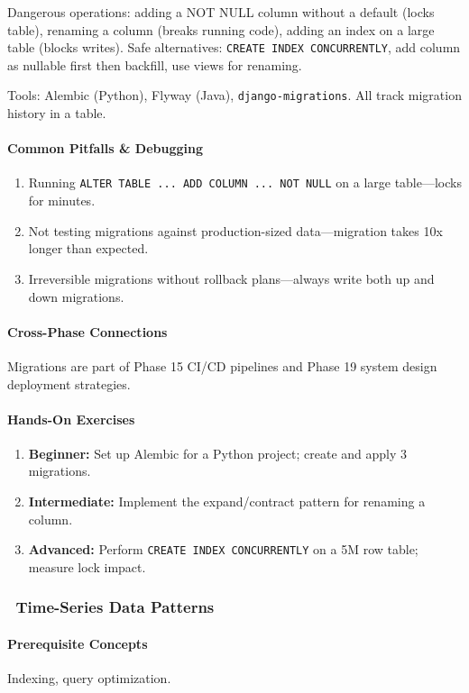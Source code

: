 \documentclass[11pt, a4paper, oneside]{report}
\newcommand{\awareness}[1]{\subsubsection{\texorpdfstring{\fcolorbox{gray!50}{gray!10}{\footnotesize\bfseries\color{gray!50!black} AWARENESS}~#1}{#1}}}
\begin{document}
Dangerous operations: adding a NOT NULL column without a default (locks table), renaming a column (breaks running code), adding an index on a large table (blocks writes). Safe alternatives: \texttt{CREATE INDEX CONCURRENTLY}, add column as nullable first then backfill, use views for renaming.

Tools: Alembic (Python), Flyway (Java), \texttt{django-migrations}. All track migration history in a table.

\paragraph{Common Pitfalls \& Debugging}
\begin{enumerate}[leftmargin=*]
\item Running \texttt{ALTER TABLE ... ADD COLUMN ... NOT NULL} on a large table---locks for minutes.
\item Not testing migrations against production-sized data---migration takes 10x longer than expected.
\item Irreversible migrations without rollback plans---always write both up and down migrations.
\end{enumerate}

\paragraph{Cross-Phase Connections} Migrations are part of Phase 15 CI/CD pipelines and Phase 19 system design deployment strategies.

\paragraph{Hands-On Exercises}
\begin{enumerate}[leftmargin=*]
\item \textbf{Beginner:} Set up Alembic for a Python project; create and apply 3 migrations.
\item \textbf{Intermediate:} Implement the expand/contract pattern for renaming a column.
\item \textbf{Advanced:} Perform \texttt{CREATE INDEX CONCURRENTLY} on a 5M row table; measure lock impact.
\end{enumerate}

\awareness{Time-Series Data Patterns}

\paragraph{Prerequisite Concepts} Indexing, query optimization.
\end{document}
